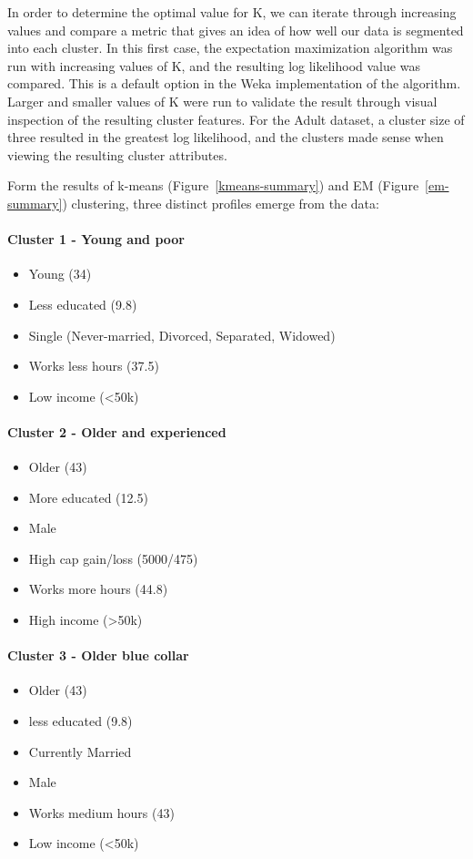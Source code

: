 \documentclass{sig-alternate}
\begin{document}

In order to determine the optimal value for K, we can iterate through increasing values and compare a metric that gives an idea of how well our data is segmented into each cluster. In this first case, the expectation maximization algorithm was run with increasing values of K, and the resulting log likelihood value was compared. This is a default option in the Weka implementation of the algorithm. Larger and smaller values of K were run to validate the result through visual inspection of the resulting cluster features. For the Adult dataset, a cluster size of three resulted in the greatest log likelihood, and the clusters made sense when viewing the resulting cluster attributes.

Form the results of k-means (Figure~\ref{kmeans-summary}) and EM (Figure~\ref{em-summary}) clustering, three distinct profiles emerge from the data:

\paragraph{Cluster 1 - Young and poor}
\begin{itemize}[itemsep=1pt]
    \item Young (34)
    \item Less educated (9.8)
    \item Single (Never-married, Divorced, Separated, Widowed)
    \item Works less hours (37.5)
    \item Low income (<50k)
\end{itemize}

\paragraph{Cluster 2 - Older and experienced}
\begin{itemize}[itemsep=1pt]
    \item Older (43)
    \item More educated (12.5)
    \item Male
    \item High cap gain/loss (5000/475)
    \item Works more hours (44.8)
    \item High income (>50k)
\end{itemize}

\paragraph{Cluster 3 - Older blue collar}
\begin{itemize}[itemsep=1pt]
    \item Older (43)
    \item less educated (9.8)
    \item Currently Married
    \item Male
    \item Works medium hours (43)
    \item Low income (<50k)
\end{itemize}
\end{document}
